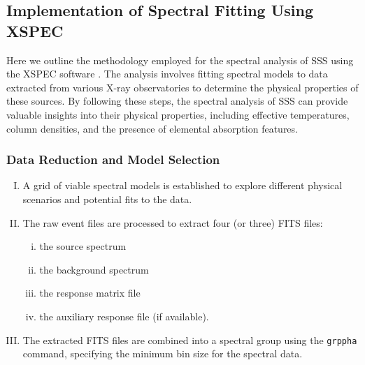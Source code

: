 		\subsection{Implementation of Spectral Fitting Using XSPEC}
			Here we outline the methodology employed for the spectral analysis of SSS using the XSPEC software \cite{xspecManualv12_9_1}. The analysis involves fitting spectral models to data extracted from various X-ray observatories to determine the physical properties of these sources. By following these steps, the spectral analysis of SSS can provide valuable insights into their physical properties, including effective temperatures, column densities, and the presence of elemental absorption features.
			
			\subsubsection{Data Reduction and Model Selection}
				\begin{enumerate}[I.]
					\item A grid of viable spectral models is established to explore different physical scenarios and potential fits to the data.
					\item The raw event files are processed to extract four (or three) FITS files:
					\begin{enumerate}[i.]
						\item the source spectrum
						\item the background spectrum
						\item the response matrix file
						\item the auxiliary response file (if available).
					\end{enumerate}
					\item The extracted FITS files are combined into a spectral group using the \texttt{grppha} command, specifying the minimum bin size for the spectral data.
				\end{enumerate}
			
